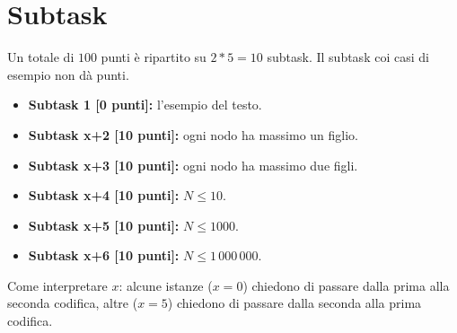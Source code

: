 \documentclass[a4paper,11pt]{article}
\begin{document}
\section*{Subtask}
Un totale di $100$ punti \`e ripartito su $2*5=10$ subtask.
Il subtask coi casi di esempio non dà punti.
\begin{itemize}
\item \textbf{Subtask 1 [0 punti]:} l'esempio del testo.
\item \textbf{Subtask x+2 [10 punti]:} ogni nodo ha massimo un figlio.
\item \textbf{Subtask x+3 [10 punti]:} ogni nodo ha massimo due figli.
\item \textbf{Subtask x+4 [10 punti]:} $N \le 10$.
\item \textbf{Subtask x+5 [10 punti]:} $N \le 1000$.
\item \textbf{Subtask x+6 [10 punti]:} $N \le 1\,000\,000$.
\end{itemize}
Come interpretare $x$: alcune istanze ($x=0$) chiedono di passare dalla prima alla seconda codifica,
altre ($x=5$) chiedono di passare dalla seconda alla prima codifica.
\end{document}
